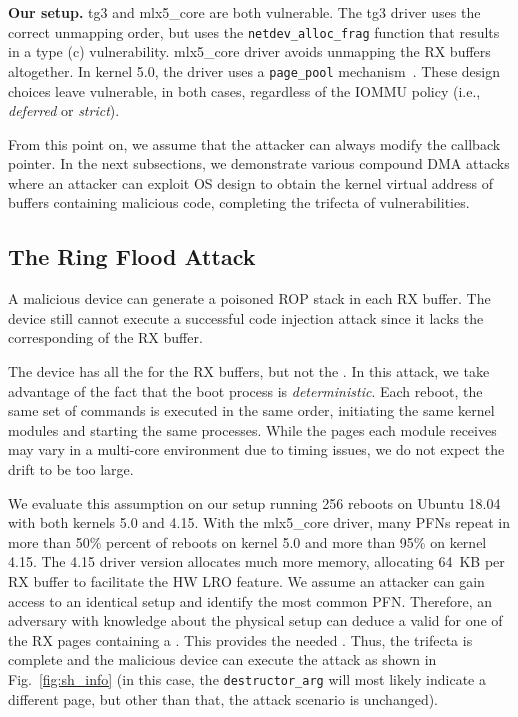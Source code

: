 \smallskip
\noindent\textbf{Our setup.} tg3 and mlx5\_core are both vulnerable. The tg3 driver uses the correct unmapping order, but uses the \texttt{netdev\_alloc\_frag} function that results in a type (c) \subpage{} vulnerability. mlx5\_core driver avoids unmapping the RX buffers altogether. In kernel 5.0, the driver uses a \texttt{page\_pool} mechanism~\cite{page_pool}. These design choices leave \shinfo{} vulnerable, in both cases, regardless of the IOMMU policy (i.e., \emph{deferred} or \emph{strict}).


From this point on, we assume that the attacker can always modify the callback pointer. In the next subsections, we demonstrate various compound DMA attacks where an attacker can exploit OS design to obtain the kernel virtual address of buffers containing malicious code, completing the trifecta of vulnerabilities.

\subsection{The Ring Flood \Compound{} Attack}\label{sec:ringflod}
A malicious device can generate a poisoned ROP stack in each RX buffer. The device still cannot execute a successful code injection attack since it lacks the corresponding \kva of the RX buffer.

The device has all the \iova{} for the RX buffers, but not the \kva{}. In this attack, we take advantage of the fact that the boot process is \emph{deterministic}. Each reboot, the same set of commands is executed in the same order, initiating the same kernel modules and starting the same processes. While the pages each module receives may vary in a multi-core environment due to timing issues, we do not expect the drift to be too large. 

We evaluate this assumption on our setup running 256 reboots on Ubuntu 18.04 with both kernels 5.0 and 4.15. With the mlx5\_core driver, many PFNs repeat in more than 50\% percent of reboots on kernel 5.0 and more than 95\% on kernel 4.15. The 4.15 driver version allocates much more memory, allocating 64~KB per RX buffer to facilitate the HW LRO feature. We assume an attacker can gain access to an identical setup and identify the most common PFN. Therefore, an adversary with knowledge about the physical setup can deduce a valid \kva{} for one of the RX pages containing a \mabaf. This provides the needed \kva. Thus, the trifecta is complete and the malicious device can execute the attack as shown in Fig.~\ref{fig:sh_info} (in this case, the \texttt{destructor\_arg} will most likely indicate a different page, but other than that, the attack scenario is unchanged).


